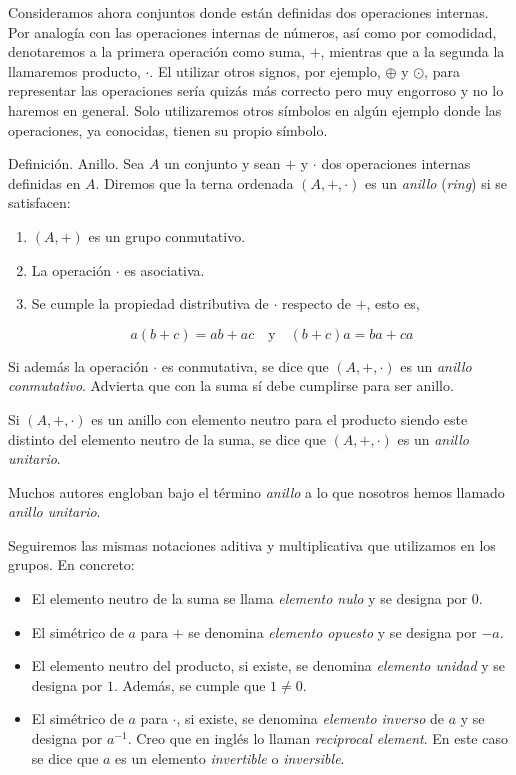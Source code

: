 




Consideramos ahora conjuntos donde están definidas dos operaciones internas.
Por analogía con las operaciones internas de números, así como por
comodidad, denotaremos a la primera operación como suma, $+$, mientras que a
la segunda la llamaremos producto, $\cdot$. El utilizar otros signos, por
ejemplo, $\oplus$ y $\odot$, para representar las operaciones sería quizás
más correcto pero muy engorroso y no lo haremos en general. Solo
utilizaremos otros símbolos en algún ejemplo donde las operaciones, ya
conocidas, tienen su propio símbolo.

Definición. Anillo. Sea $A$ un conjunto y sean $+$ y $\cdot$ dos operaciones
internas definidas en $A$. Diremos que la terna ordenada $(A, +, \cdot)$ es
un \emph{anillo} (\emph{ring}) si se satisfacen:

\begin{enumerate}
  \item $(A, +)$ es un grupo conmutativo.
  \item La operación $\cdot$ es asociativa.
  \item Se cumple la propiedad distributiva de $\cdot$ respecto de $+$, esto
    es,

    $$ a(b + c) = ab + ac \quad \text{y} \quad (b + c)a = ba + ca $$
\end{enumerate}

Si además la operación $\cdot$ es conmutativa, se dice que $(A, +, \cdot)$
es un \emph{anillo conmutativo}. Advierta que con la suma sí debe cumplirse
para ser anillo.

Si $(A, +, \cdot)$ es un anillo con elemento neutro para el producto siendo
este distinto del elemento neutro de la suma, se dice que $(A, +, \cdot)$ es
un \emph{anillo unitario}.

Muchos autores engloban bajo el término \emph{anillo} a lo que nosotros
hemos llamado \emph{anillo unitario}.

Seguiremos las mismas notaciones aditiva y multiplicativa que utilizamos en
los grupos. En concreto:

\begin{itemize}
  \item El elemento neutro de la suma se llama \emph{elemento nulo} y se
    designa por $0$.
  \item El simétrico de $a$ para $+$ se denomina \emph{elemento opuesto} y
    se designa por ${-a}$.
  \item El elemento neutro del producto, si existe, se denomina
    \emph{elemento unidad} y se designa por $1$. Además, se cumple que $1
    \neq 0$.
  \item El simétrico de $a$ para $\cdot$, si existe, se denomina
    \emph{elemento inverso} de $a$ y se designa por $a^{-1}$. Creo que en
    inglés lo llaman \emph{reciprocal element}. En este caso se dice que $a$
    es un elemento \emph{invertible} o \emph{inversible}.
\end{itemize}


